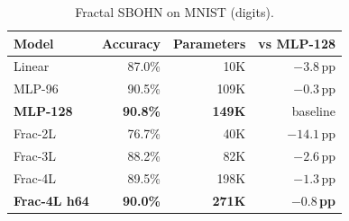 \begin{table}[h]
\centering
\caption{Fractal SBOHN on MNIST (digits).}
\begin{tabular}{l r r r}
\hline
Model & Accuracy & Parameters & vs MLP-128 \\
\hline
Linear & 87.0\% & 10K & $-3.8$\,pp \\
MLP-96 & 90.5\% & 109K & $-0.3$\,pp \\
\textbf{MLP-128} & \textbf{90.8\%} & \textbf{149K} & baseline \\
Frac-2L & 76.7\% & 40K & $-14.1$\,pp \\
Frac-3L & 88.2\% & 82K & $-2.6$\,pp \\
Frac-4L & 89.5\% & 198K & $-1.3$\,pp \\
\textbf{Frac-4L h64} & \textbf{90.0\%} & \textbf{271K} & $\mathbf{-0.8}$\,\textbf{pp} \\
\hline
\end{tabular}
\end{table}
